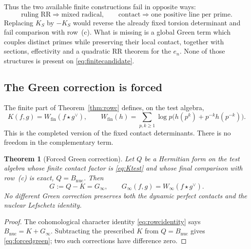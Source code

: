 \documentclass[11pt]{amsart}
\newtheorem{theorem}{Theorem}[section]
\theoremstyle{definition}
\theoremstyle{remark}
\begin{document}
Thus the two available finite constructions fail in opposite ways:
\begin{equation}\label{eq:finitealternative}
 \text{ruling RR}\Longrightarrow\text{mixed radical},
 \qquad
 \text{contact}\Longrightarrow\text{one positive line per prime}.
\end{equation}
Replacing $K_S$ by $-K_S$ would reverse the already fixed torsion determinant
and fail comparison with row~(c).  What is missing is a global Green term
which couples distinct primes while preserving their local contact, together
with sections, effectivity and a quadratic RR theorem for the $e_n$.  None of
those structures is present on \eqref{eq:finitecandidate}.

\subsection{The Green correction is forced}

The finite part of Theorem~\ref{thm:rowc} defines, on the test algebra,
\begin{equation}\label{eq:Ktest}
 K(f,g)=W_{\mathrm{fin}}(f\star g^\vee),\qquad
 W_{\mathrm{fin}}(h)=\sum_{p,k\ge1}\log p
 \bigl(h(p^k)+p^{-k}h(p^{-k})\bigr).
\end{equation}
This is the completed version of the fixed contact determinants.  There is
no freedom in the complementary term.

\begin{theorem}[Forced Green correction]
\label{thm:forcedgreen}
Let $Q$ be a Hermitian form on the test algebra whose finite contact factor
is \eqref{eq:Ktest} and whose final comparison with row~(c) is exact,
$Q=B_{\mathrm{nuc}}$.  Then
\begin{equation}\label{eq:forcedgreen}
 G:=Q-K=G_\infty,\qquad
 G_\infty(f,g)=W_\infty(f\star g^\vee).
\end{equation}
No different Green correction preserves both the dynamic perfect contacts and the
nuclear Lefschetz identity.
\end{theorem}

\begin{proof}
The cohomological character identity \eqref{eq:rowcidentity} says
$B_{\mathrm{nuc}}=K+G_\infty$.  Subtracting the prescribed $K$ from
$Q=B_{\mathrm{nuc}}$ gives \eqref{eq:forcedgreen}; two such corrections have
difference zero.
\end{proof}
\end{document}
